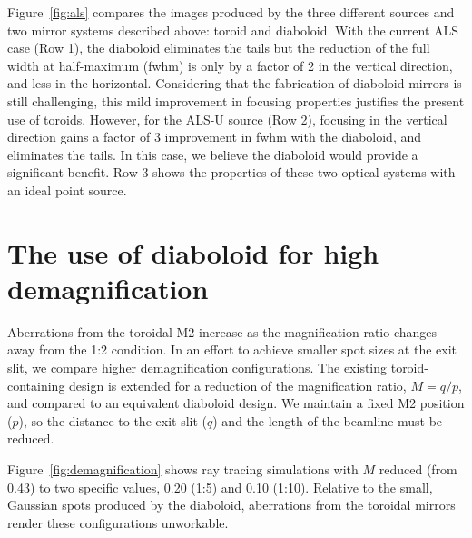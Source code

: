 \documentclass[preprint]{iucr}       %
\begin{document}
Figure~\ref{fig:als} compares the images produced by the three different sources and two mirror systems described above: toroid and diaboloid. With the current ALS case (Row 1), the diaboloid eliminates the tails but the reduction of the full width at half-maximum (fwhm) is only by a factor of 2 in the vertical direction, and less in the horizontal. Considering that the fabrication of diaboloid mirrors is still challenging, this mild improvement in focusing properties justifies the present use of toroids. However, for the ALS-U source (Row 2), focusing in the vertical direction gains a factor of 3 improvement in fwhm with the diaboloid, and eliminates the tails. In this case, we believe the diaboloid would provide a significant benefit. Row 3 shows the properties of these two optical systems with an ideal point source.

\section{The use of diaboloid for high demagnification}
\label{sec:scan}

Aberrations from the toroidal M2 increase as the magnification ratio changes away from the 1:2 condition. In an effort to achieve smaller spot sizes at the exit slit, we compare higher demagnification configurations. The existing toroid-containing design is extended for a reduction of the magnification ratio, $M=q/p$, and compared to an equivalent diaboloid design. We maintain a fixed M2 position ($p$), so the distance to the exit slit ($q$) and the length of the beamline must be reduced.

Figure~\ref{fig:demagnification} shows ray tracing simulations with $M$ reduced (from 0.43) to two specific values, 0.20 (1:5) and 0.10 (1:10). Relative to the small, Gaussian spots produced by the diaboloid, aberrations from the toroidal mirrors render these configurations unworkable.
\end{document}
